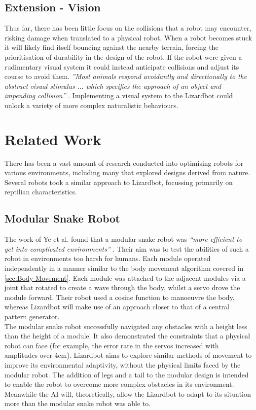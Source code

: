 \documentclass{article}
\begin{document}
\subsection{Extension - Vision}
\label{sec:Vision}
Thus far, there has been little focus on the collisions that a robot may encounter, risking damage when translated to a physical robot. When a robot becomes stuck it will likely find itself bouncing against the nearby terrain, forcing the prioritisation of durability in the design of the robot. If the robot were given a rudimentary visual system it could instead anticipate collisions and adjust its course to avoid them. 
\textit{”Most animals respond avoidantly and directionally to the abstract visual stimulus ... which specifies the approach of an object and impending collision”} . Implementing a visual system to the Lizardbot could unlock a variety of more complex naturalistic behaviours.

\newpage
\section{Related Work}
\label{sec:Project Relevance}
There has been a vast amount of research conducted into optimising robots for various environments, including many that explored designs derived from nature. Several robots took a similar approach to Lizardbot, focussing primarily on reptilian characteristics.
\subsection{Modular Snake Robot}
\label{sec:Modular Snake Robot}
The work of Ye et al.  found that a modular snake robot was \textit{“more efficient to get into complicated environments”} . Their aim was to test the abilities of such a robot in environments too harsh for humans. Each module operated independently in a manner similar to the body movement algorithm covered in \ref{sec:Body Movement}. Each module was attached to the adjacent modules via a joint that rotated to create a wave through the body, whilst a servo drove the module forward. Their robot used a cosine function to manoeuvre the body, whereas Lizardbot will make use of an approach closer to that of a central pattern generator. \\
The modular snake robot successfully navigated any obstacles with a height less than the height of a module. It also demonstrated the constraints that a physical robot can face (for example, the error rate in the servos increased with amplitudes over 4cm). Lizardbot aims to explore similar methods of movement to improve its environmental adaptivity, without the physical limits faced by the modular robot. The addition of legs and a tail to the modular design is intended to enable the robot to overcome more complex obstacles in its environment. Meanwhile the AI will, theoretically, allow the Lizardbot to adapt to its situation more than the modular snake robot was able to.
\end{document}
